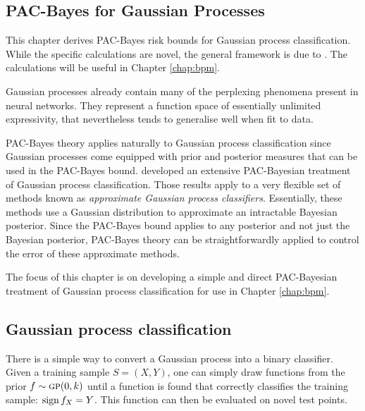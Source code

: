 \begin{refsection}

\chapter{PAC-Bayes for Gaussian Processes}
\label{chap:gp-pac-bayes}

\begin{tcolorbox}
This chapter derives PAC-Bayes risk bounds for Gaussian process classification. While the specific calculations are novel, the general framework is due to \citet{seeger}. The calculations will be useful in Chapter \ref{chap:bpm}.
\end{tcolorbox}

Gaussian processes already contain many of the perplexing phenomena present in neural networks. They represent a function space of essentially unlimited expressivity, that nevertheless tends to generalise well when fit to data.

PAC-Bayes theory applies naturally to Gaussian process classification since Gaussian processes come equipped with prior and posterior measures that can be used in the PAC-Bayes bound. \citet{seeger} developed an extensive PAC-Bayesian treatment of Gaussian process classification. Those results apply to a very flexible set of methods known as \textit{approximate Gaussian process classifiers}. Essentially, these methods use a Gaussian distribution to approximate an intractable Bayesian posterior. Since the PAC-Bayes bound applies to any posterior and not just the Bayesian posterior, PAC-Bayes theory can be straightforwardly applied to control the error of these approximate methods. 

The focus of this chapter is on developing a simple and direct PAC-Bayesian treatment of Gaussian process classification for use in Chapter \ref{chap:bpm}.

\section{Gaussian process classification}\label{sec:gpc}

There is a simple way to convert a Gaussian process into a binary classifier. Given a training sample $S=(X,Y)$, one can simply draw functions from the prior $f\sim\textsc{gp}(0,k)$ until a function is found that correctly classifies the training sample: $\operatorname{sign} f_X = Y$. This function can then be evaluated on novel test points.


\end{refsection}
